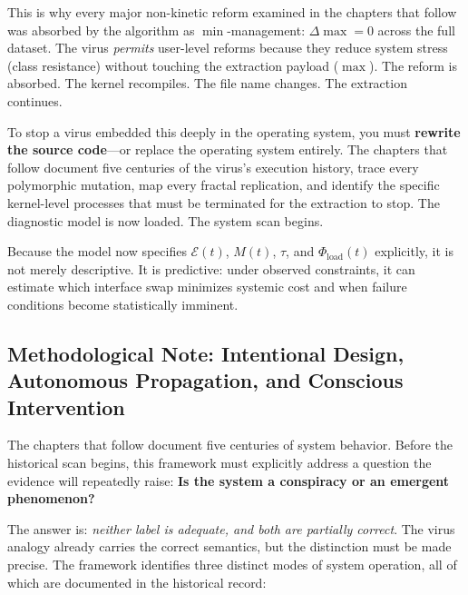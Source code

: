 \documentclass[12pt,openany]{book}
\begin{document}
This is why every major non-kinetic reform examined in the chapters that follow was absorbed by the algorithm as $\min$-management: $\Delta\max = 0$ across the full dataset. The virus \textit{permits} user-level reforms because they reduce system stress (class resistance) without touching the extraction payload ($\max$). The reform is absorbed. The kernel recompiles. The file name changes. The extraction continues.

To stop a virus embedded this deeply in the operating system, you must \textbf{rewrite the source code}---or replace the operating system entirely. The chapters that follow document five centuries of the virus's execution history, trace every polymorphic mutation, map every fractal replication, and identify the specific kernel-level processes that must be terminated for the extraction to stop. The diagnostic model is now loaded. The system scan begins.

Because the model now specifies $\mathcal{E}(t)$, $M(t)$, $\tau$, and $\Phi_{\text{load}}(t)$ explicitly, it is not merely descriptive. It is predictive: under observed constraints, it can estimate which interface swap minimizes systemic cost and when failure conditions become statistically imminent.

\subsection{Methodological Note: Intentional Design, Autonomous Propagation, and Conscious Intervention}

The chapters that follow document five centuries of system behavior. Before the historical scan begins, this framework must explicitly address a question the evidence will repeatedly raise: \textbf{Is the system a conspiracy or an emergent phenomenon?}

The answer is: \textit{neither label is adequate, and both are partially correct}. The virus analogy already carries the correct semantics, but the distinction must be made precise. The framework identifies three distinct modes of system operation, all of which are documented in the historical record:
\end{document}

